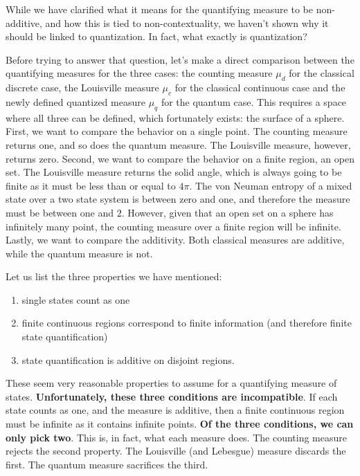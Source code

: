 \documentclass[10pt,twocolumn, nofootinbib]{revtex4-2}
\begin{document}
While we have clarified what it means for the quantifying measure to be non-additive, and how this is tied to non-contextuality, we haven't shown why it should be linked to quantization. In fact, what exactly is quantization?

Before trying to answer that question, let's make a direct comparison between the quantifying measures for the three cases: the counting measure $\mu_d$ for the classical discrete case, the Louisville measure $\mu_c$ for the classical continuous case and the newly defined quantized measure $\mu_q$ for the quantum case. This requires a space where all three can be defined, which fortunately exists: the surface of a sphere. First, we want to compare the behavior on a single point. The counting measure returns one, and so does the quantum measure. The Louisville measure, however, returns zero. Second, we want to compare the behavior on a finite region, an open set. The Louisville measure returns the solid angle, which is always going to be finite as it must be less than or equal to $4\pi$. The von Neuman entropy of a mixed state over a two state system is between zero and one, and therefore the measure must be between one and $2$. However, given that an open set on a sphere has infinitely many point, the counting measure over a finite region will be infinite. Lastly, we want to compare the additivity. Both classical measures are additive, while the quantum measure is not.

Let us list the three properties we have mentioned:
\begin{enumerate}
	\item single states count as one
	\item finite continuous regions correspond to finite information (and therefore finite state quantification)
	\item state quantification is additive on disjoint regions.
\end{enumerate}
These seem very reasonable properties to assume for a quantifying measure of states. \textbf{Unfortunately, these three conditions are incompatible}. If each state counts as one, and the measure is additive, then a finite continuous region must be infinite as it contains infinite points. \textbf{Of the three conditions, we can only pick two}. This is, in fact, what each measure does. The counting measure rejects the second property. The Louisville (and Lebesgue) measure discards the first. The quantum measure sacrifices the third.
\end{document}
